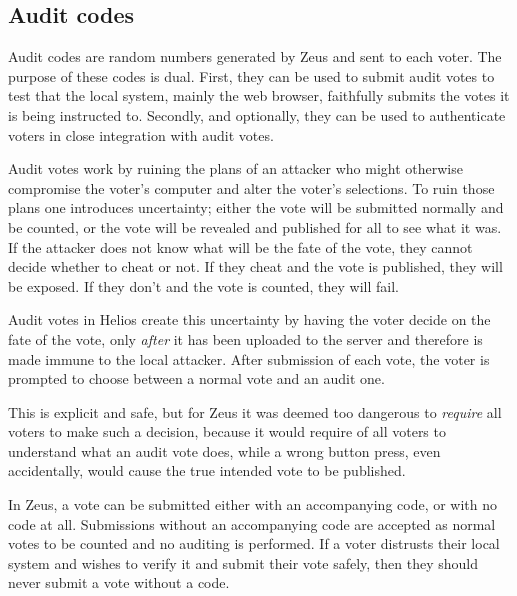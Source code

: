 \documentclass[letterpaper,10pt]{article}
\begin{document}
\subsection{Audit codes}
\label{sec:audit_codes}
Audit codes are random numbers generated by Zeus and sent to each voter.
The purpose of these codes is dual.
First, they can be used to submit audit votes to test that the local
system, mainly the web browser, faithfully submits the votes it is
being instructed to.
Secondly, and optionally, they can be used to authenticate voters in close
integration with audit votes.

Audit votes work by ruining the plans of an attacker who might otherwise
compromise the voter's computer and alter the voter's selections.
To ruin those plans one introduces uncertainty;
either the vote will be submitted normally and be counted,
or the vote will be revealed and published for all to see what it was.
If the attacker does not know what will be the fate of the vote,
they cannot decide whether to cheat or not.
If they cheat and the vote is published, they will be exposed.
If they don't and the vote is counted, they will fail.

Audit votes in Helios create this uncertainty by having the voter decide
on the fate of the vote, only \emph{after} it has been uploaded to the
server and therefore is made immune to the local attacker.
After submission of each vote, the voter is prompted to choose
between a normal vote and an audit one.

This is explicit and safe, but for Zeus it was deemed too dangerous to
\emph{require} all voters to make such a decision, because it would
require of all voters to understand what an audit vote does,
while a wrong button press, even accidentally,
would cause the true intended vote to be published.

In Zeus, a vote can be submitted either with an accompanying code,
or with no code at all.
Submissions without an accompanying code are accepted
as normal votes to be counted and no auditing is performed.
If a voter distrusts their local system and wishes to verify it
and submit their vote safely, then they should never submit
a vote without a code.
\end{document}
